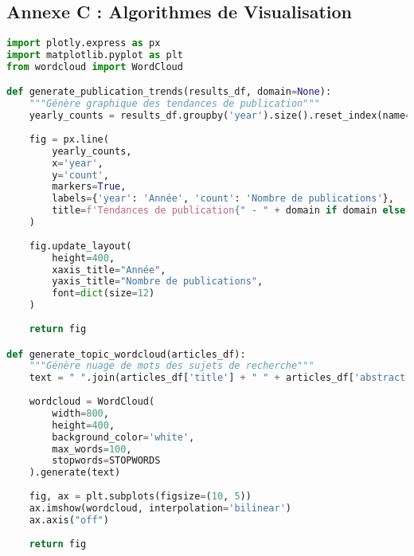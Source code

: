 \documentclass[12pt,a4paper]{article}
\begin{document}
\subsection{Annexe C : Algorithmes de Visualisation}

\begin{lstlisting}[language=Python, caption=Génération de visualisations intelligentes]
import plotly.express as px
import matplotlib.pyplot as plt
from wordcloud import WordCloud

def generate_publication_trends(results_df, domain=None):
    """Génère graphique des tendances de publication"""
    yearly_counts = results_df.groupby('year').size().reset_index(name='count')
    
    fig = px.line(
        yearly_counts, 
        x='year', 
        y='count',
        markers=True,
        labels={'year': 'Année', 'count': 'Nombre de publications'},
        title=f'Tendances de publication{" - " + domain if domain else ""}'
    )
    
    fig.update_layout(
        height=400,
        xaxis_title="Année",
        yaxis_title="Nombre de publications",
        font=dict(size=12)
    )
    
    return fig

def generate_topic_wordcloud(articles_df):
    """Génère nuage de mots des sujets de recherche"""
    text = " ".join(articles_df['title'] + " " + articles_df['abstract'])
    
    wordcloud = WordCloud(
        width=800, 
        height=400,
        background_color='white',
        max_words=100,
        stopwords=STOPWORDS
    ).generate(text)
    
    fig, ax = plt.subplots(figsize=(10, 5))
    ax.imshow(wordcloud, interpolation='bilinear')
    ax.axis("off")
    
    return fig
\end{lstlisting}

\newpage


\end{document}
